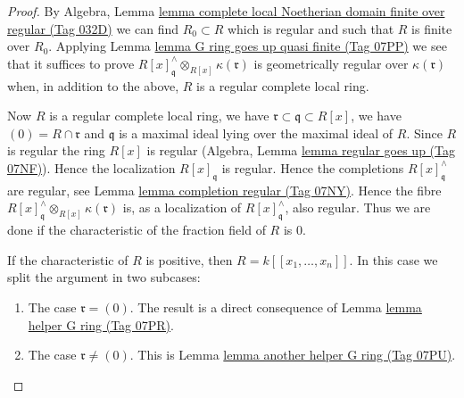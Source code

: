 \documentclass{amsart}
\theoremstyle{plain}
\theoremstyle{definition}
\theoremstyle{remark}
\numberwithin{equation}{subsection}
\begin{document}
\begin{proof}
\medskip\noindent
By  Algebra, Lemma
\href{https://stacks.math.columbia.edu/tag/032D}{lemma complete local Noetherian domain finite over regular (Tag 032D)}
we can find $R_0 \subset R$ which is regular and such that $R$ is
finite over $R_0$. Applying Lemma \href{https://stacks.math.columbia.edu/tag/07PP}{lemma G ring goes up quasi finite (Tag 07PP)}
we see that it suffices to prove
$R[x]_\mathfrak q^\wedge \otimes_{R[x]} \kappa(\mathfrak r)$
is geometrically regular over $\kappa(\mathfrak r)$ when, in addition to the
above, $R$ is a regular complete local ring.

\medskip\noindent
Now $R$ is a regular complete local ring, we have
$\mathfrak r \subset \mathfrak q \subset R[x]$, we have
$(0) = R \cap \mathfrak r$ and $\mathfrak q$ is a maximal ideal
lying over the maximal ideal of $R$. Since $R$ is regular the
ring $R[x]$ is regular (Algebra, Lemma \href{https://stacks.math.columbia.edu/tag/07NF}{lemma regular goes up (Tag 07NF)}).
Hence the localization $R[x]_\mathfrak q$ is regular.
Hence the completions $R[x]_\mathfrak q^\wedge$ are regular, see
Lemma \href{https://stacks.math.columbia.edu/tag/07NY}{lemma completion regular (Tag 07NY)}.
Hence the fibre $R[x]_{\mathfrak q}^\wedge \otimes_{R[x]} \kappa(\mathfrak r)$
is, as a localization of $R[x]_\mathfrak q^\wedge$, also regular.
Thus we are done if the characteristic of the fraction field of $R$ is $0$.

\medskip\noindent
If the characteristic of $R$ is positive, then $R = k[[x_1, \ldots, x_n]]$.
In this case we split the argument in two subcases:
\begin{enumerate}
\item The case $\mathfrak r = (0)$. The result is a direct consequence
of Lemma \href{https://stacks.math.columbia.edu/tag/07PR}{lemma helper G ring (Tag 07PR)}.
\item The case $\mathfrak r \not = (0)$. This is
Lemma \href{https://stacks.math.columbia.edu/tag/07PU}{lemma another helper G ring (Tag 07PU)}.
\end{enumerate}
\end{proof}
\end{document}
